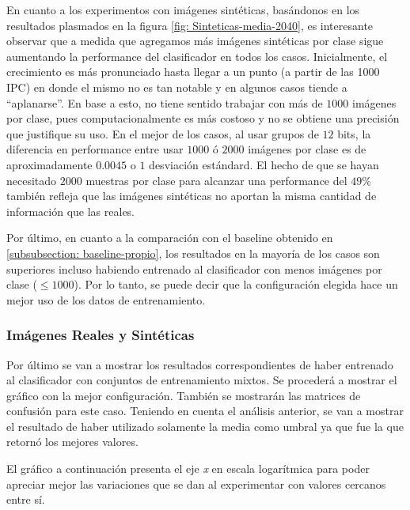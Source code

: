 	En cuanto a los experimentos con imágenes sintéticas, basándonos en los resultados plasmados en la figura \ref{fig: Sinteticas-media-2040}, es interesante observar que a medida que agregamos más imágenes sintéticas por clase sigue aumentando la performance del clasificador en todos los casos. Inicialmente, el crecimiento es más pronunciado hasta llegar a un punto (a partir de las 1000 IPC) en donde el mismo no es tan notable y en algunos casos tiende a ``aplanarse''. En base a esto, no tiene sentido trabajar con más de $1000$ imágenes por clase, pues computacionalmente es más costoso y no se obtiene una precisión que justifique su uso. En el mejor de los casos, al usar grupos de $12$ bits, la diferencia en performance entre usar $1000$ ó $2000$ imágenes por clase es de aproximadamente $0.0045$ o $1$ desviación estándard. El hecho de que se hayan necesitado $2000$ muestras por clase para alcanzar una performance del $49\%$ también refleja que las imágenes sintéticas no aportan la misma cantidad de información que las reales.

	Por último, en cuanto a la comparación con el baseline obtenido en \ref{subsubsection: baseline-propio}, los resultados en la mayoría de los casos son superiores incluso habiendo entrenado al clasificador con menos imágenes por clase ($\leq 1000$). Por lo tanto, se puede decir que la configuración elegida hace un mejor uso de los datos de entrenamiento.

\newpage
    	\subsubsection{Imágenes Reales y Sintéticas}

	Por último se van a mostrar los resultados correspondientes de haber entrenado al clasificador con conjuntos de entrenamiento mixtos. Se procederá a mostrar el gráfico con la mejor configuración. También se mostrarán las matrices de confusión para este caso. Teniendo en cuenta el análisis anterior, se van a mostrar el resultado de haber utilizado solamente la media como umbral ya que fue la que retornó los mejores valores.

	El gráfico a continuación presenta el eje \textit{x} en escala logarítmica para poder apreciar mejor las variaciones que se dan al experimentar con valores cercanos entre sí.

